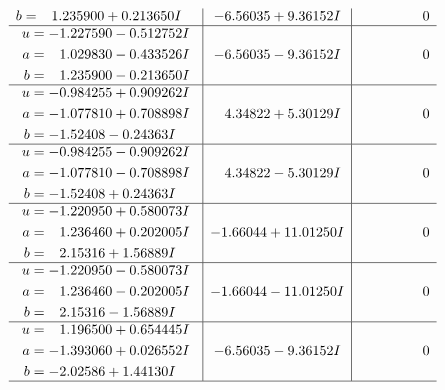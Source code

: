 \documentclass[1p]{elsarticle_modified}
\theoremstyle{definition}
\begin{document}
$$\begin{array}{c|c|c}
\begin{aligned}
b &= \phantom{-}1.235900 + 0.213650 I\end{aligned}
 & -6.56035 + 9.36152 I & \phantom{-0.000000 } 0 \\ \hline\begin{aligned}
u &= -1.227590 - 0.512752 I \\
a &= \phantom{-}1.029830 - 0.433526 I \\
b &= \phantom{-}1.235900 - 0.213650 I\end{aligned}
 & -6.56035 - 9.36152 I & \phantom{-0.000000 } 0 \\ \hline\begin{aligned}
u &= -0.984255 + 0.909262 I \\
a &= -1.077810 + 0.708898 I \\
b &= -1.52408 - 0.24363 I\end{aligned}
 & \phantom{-}4.34822 + 5.30129 I & \phantom{-0.000000 } 0 \\ \hline\begin{aligned}
u &= -0.984255 - 0.909262 I \\
a &= -1.077810 - 0.708898 I \\
b &= -1.52408 + 0.24363 I\end{aligned}
 & \phantom{-}4.34822 - 5.30129 I & \phantom{-0.000000 } 0 \\ \hline\begin{aligned}
u &= -1.220950 + 0.580073 I \\
a &= \phantom{-}1.236460 + 0.202005 I \\
b &= \phantom{-}2.15316 + 1.56889 I\end{aligned}
 & -1.66044 + 11.01250 I & \phantom{-0.000000 } 0 \\ \hline\begin{aligned}
u &= -1.220950 - 0.580073 I \\
a &= \phantom{-}1.236460 - 0.202005 I \\
b &= \phantom{-}2.15316 - 1.56889 I\end{aligned}
 & -1.66044 - 11.01250 I & \phantom{-0.000000 } 0 \\ \hline\begin{aligned}
u &= \phantom{-}1.196500 + 0.654445 I \\
a &= -1.393060 + 0.026552 I \\
b &= -2.02586 + 1.44130 I\end{aligned}
 & -6.56035 - 9.36152 I & \phantom{-0.000000 } 0\\
 \hline 
 \end{array}$$\newpage$$\begin{array}{c|c|c}  

\end{array}$$
\end{document}
